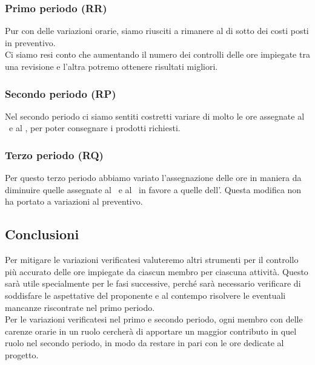     	\subsubsection{Primo periodo (RR)}
   		Pur con delle variazioni orarie, siamo riusciti a rimanere al di sotto dei costi posti in preventivo.\\
   		Ci siamo resi conto che aumentando il numero dei controlli delle ore impiegate tra una revisione e l'altra potremo ottenere risultati migliori.
	
    	\subsubsection{Secondo periodo (RP)}
    	Nel secondo periodo ci siamo sentiti costretti variare di molto le ore assegnate al \Progr\ e al \Prog, per poter consegnare i prodotti richiesti.
    	
    	\subsubsection{Terzo periodo (RQ)}
    	Per questo terzo periodo abbiamo variato l'assegnazione delle ore in maniera da diminuire quelle assegnate al \Progr\ e al \Ver\ in favore a quelle dell'\Ana. 
    	Questa modifica non ha portato a variazioni al preventivo.
    	
	\subsection{Conclusioni}
	Per mitigare le variazioni verificatesi valuteremo altri strumenti per il controllo più accurato delle ore impiegate da ciascun membro per ciascuna attività.
	Questo sarà utile specialmente per le fasi successive, perché sarà necessario verificare di soddisfare le aspettative del proponente e al contempo risolvere le eventuali mancanze riscontrate nel primo periodo.\\
	Per le variazioni verificatesi nel primo e secondo periodo, ogni membro con delle carenze orarie in un ruolo cercherà di apportare un maggior contributo in quel ruolo nel secondo periodo, in modo da restare in pari con le ore dedicate al progetto.
	